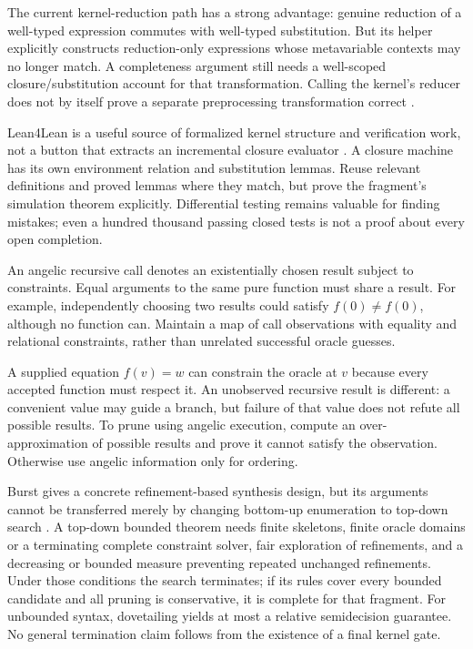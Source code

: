 The current kernel-reduction path has a strong advantage: genuine reduction
of a well-typed expression commutes with well-typed substitution. But its
 helper explicitly constructs reduction-only
expressions whose metavariable contexts may no longer match. A completeness
argument still needs a well-scoped closure/substitution account for that
transformation. Calling the kernel's reducer does not by itself prove a
separate preprocessing transformation correct \cite{searchcode}.

Lean4Lean is a useful source of formalized kernel structure and verification
work, not a button that extracts an incremental closure evaluator
\cite{lean4lean}. A closure machine has its own environment relation and
substitution lemmas. Reuse relevant definitions and proved lemmas where they
match, but prove the fragment's simulation theorem explicitly. Differential
testing remains valuable for finding mistakes; even a hundred thousand passing
closed tests is not a proof about every open completion.


An angelic recursive call denotes an existentially chosen result subject to
constraints. Equal arguments to the same pure function must share a result.
For example, independently choosing two results could satisfy
$f(0)\ne f(0)$, although no function can. Maintain a map of call observations
with equality and relational constraints, rather than unrelated successful
oracle guesses.

A supplied equation $f(v)=w$ can constrain the oracle at $v$ because every
accepted function must respect it. An unobserved recursive result is different:
a convenient value may guide a branch, but failure of that value does not
refute all possible results. To prune using angelic execution, compute an
over-approximation of possible results and prove it cannot satisfy the
observation. Otherwise use angelic information only for ordering.

Burst gives a concrete refinement-based synthesis design, but its arguments
cannot be transferred merely by changing bottom-up enumeration to top-down
search \cite{burst}. A top-down bounded theorem needs finite skeletons, finite
oracle domains or a terminating complete constraint solver, fair exploration
of refinements, and a decreasing or bounded measure preventing repeated
unchanged refinements. Under those conditions the search terminates; if its
rules cover every bounded candidate and all pruning is conservative, it is
complete for that fragment. For unbounded syntax, dovetailing yields at most
a relative semidecision guarantee. No general termination claim follows from
the existence of a final kernel gate.
